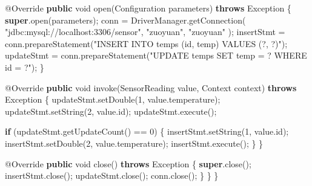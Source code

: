 \documentclass[cn,11pt,chinese]{elegantbook}
\newenvironment{Shaded}{}{}
\newcommand{\AttributeTok}[1]{\textcolor[rgb]{0.49,0.56,0.16}{#1}}
\newcommand{\BuiltInTok}[1]{#1}
\newcommand{\DataTypeTok}[1]{\textcolor[rgb]{0.56,0.13,0.00}{#1}}
\newcommand{\DecValTok}[1]{\textcolor[rgb]{0.25,0.63,0.44}{#1}}
\newcommand{\FunctionTok}[1]{\textcolor[rgb]{0.02,0.16,0.49}{#1}}
\newcommand{\KeywordTok}[1]{\textcolor[rgb]{0.00,0.44,0.13}{\textbf{#1}}}
\newcommand{\NormalTok}[1]{#1}
\newcommand{\StringTok}[1]{\textcolor[rgb]{0.25,0.44,0.63}{#1}}
\begin{document}
\begin{Shaded}
\begin{Highlighting}[]
        \AttributeTok{@Override}
        \KeywordTok{public} \DataTypeTok{void} \FunctionTok{open}\NormalTok{(}\BuiltInTok{Configuration}\NormalTok{ parameters) }\KeywordTok{throws} \BuiltInTok{Exception}\NormalTok{ \{}
            \KeywordTok{super}\NormalTok{.}\FunctionTok{open}\NormalTok{(parameters);}
\NormalTok{            conn = }\BuiltInTok{DriverManager}\NormalTok{.}\FunctionTok{getConnection}\NormalTok{(}
                    \StringTok{"jdbc:mysql://localhost:3306/sensor"}\NormalTok{,}
                    \StringTok{"zuoyuan"}\NormalTok{,}
                    \StringTok{"zuoyuan"}
\NormalTok{            );}
\NormalTok{            insertStmt = conn.}\FunctionTok{prepareStatement}\NormalTok{(}\StringTok{"INSERT INTO temps (id, temp) VALUES (?, ?)"}\NormalTok{);}
\NormalTok{            updateStmt = conn.}\FunctionTok{prepareStatement}\NormalTok{(}\StringTok{"UPDATE temps SET temp = ? WHERE id = ?"}\NormalTok{);}
\NormalTok{        \}}

        \AttributeTok{@Override}
        \KeywordTok{public} \DataTypeTok{void} \FunctionTok{invoke}\NormalTok{(SensorReading value, }\BuiltInTok{Context}\NormalTok{ context) }\KeywordTok{throws} \BuiltInTok{Exception}\NormalTok{ \{}
\NormalTok{            updateStmt.}\FunctionTok{setDouble}\NormalTok{(}\DecValTok{1}\NormalTok{, value.}\FunctionTok{temperature}\NormalTok{);}
\NormalTok{            updateStmt.}\FunctionTok{setString}\NormalTok{(}\DecValTok{2}\NormalTok{, value.}\FunctionTok{id}\NormalTok{);}
\NormalTok{            updateStmt.}\FunctionTok{execute}\NormalTok{();}

            \KeywordTok{if}\NormalTok{ (updateStmt.}\FunctionTok{getUpdateCount}\NormalTok{() == }\DecValTok{0}\NormalTok{) \{}
\NormalTok{                insertStmt.}\FunctionTok{setString}\NormalTok{(}\DecValTok{1}\NormalTok{, value.}\FunctionTok{id}\NormalTok{);}
\NormalTok{                insertStmt.}\FunctionTok{setDouble}\NormalTok{(}\DecValTok{2}\NormalTok{, value.}\FunctionTok{temperature}\NormalTok{);}
\NormalTok{                insertStmt.}\FunctionTok{execute}\NormalTok{();}
\NormalTok{            \}}
\NormalTok{        \}}

        \AttributeTok{@Override}
        \KeywordTok{public} \DataTypeTok{void} \FunctionTok{close}\NormalTok{() }\KeywordTok{throws} \BuiltInTok{Exception}\NormalTok{ \{}
            \KeywordTok{super}\NormalTok{.}\FunctionTok{close}\NormalTok{();}
\NormalTok{            insertStmt.}\FunctionTok{close}\NormalTok{();}
\NormalTok{            updateStmt.}\FunctionTok{close}\NormalTok{();}
\NormalTok{            conn.}\FunctionTok{close}\NormalTok{();}
\NormalTok{        \}}
\NormalTok{    \}}
\NormalTok{\}}
\end{Highlighting}
\end{Shaded}
\end{document}
